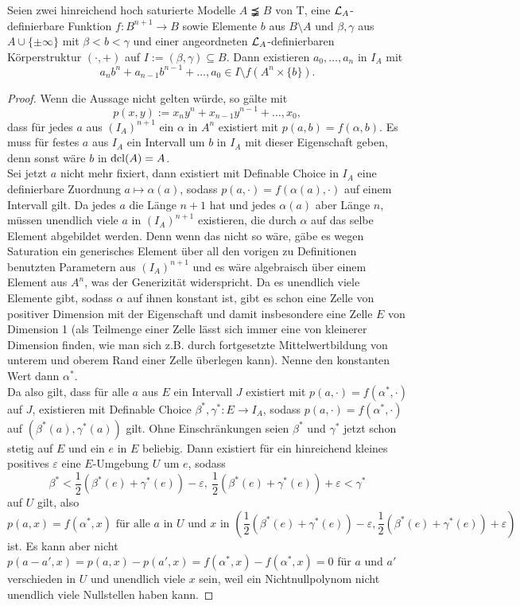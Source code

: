 \begin{lemma}\label{Hilfsaussage Kleinheit}
	Seien zwei hinreichend hoch saturierte Modelle $A\precneqq B$ von T, eine $\mathcal{L}_A$-definierbare Funktion $f:B^{n+1}\rightarrow B$ sowie Elemente $b$ aus $B\setminus A$ und $\beta,\gamma$ aus $A\cup\{\pm\infty\}$ mit $\beta<b<\gamma$ und einer angeordneten $\mathcal{L}_A$-definierbaren Körperstruktur $(\cdot,+)$ auf $I:=(\beta,\gamma)\subseteq B$. Dann existieren $a_0,\dots,a_n$ in $I_A$ mit $$a_nb^n+a_{n-1}b^{n-1}+\dots,a_0\in I\setminus f(A^n\times\{b\}).$$
\end{lemma}
\newpage
\begin{proof}
	Wenn die Aussage nicht gelten würde, so gälte mit $$p(x,y):=x_ny^n+x_{n-1}y^{n-1}+\dots,x_0,$$ dass für jedes $a$ aus $(I_A)^{n+1}$ ein $\alpha$ in $A^n$ existiert mit $p(a,b)=f(\alpha,b)$. Es muss für festes $a$ aus $I_A$ ein Intervall um $b$ in $I_A$ mit dieser Eigenschaft geben, denn sonst wäre $b$ in $\operatorname{dcl}(A)=A$.\\
	Sei jetzt $a$ nicht mehr fixiert, dann existiert mit Definable Choice in $I_A$ eine definierbare Zuordnung $a\mapsto\alpha(a)$, sodass $p(a,\cdot)=f(\alpha(a),\cdot)$ auf einem Intervall gilt. Da jedes $a$ die Länge $n+1$ hat und jedes $\alpha(a)$ aber Länge $n$, müssen unendlich viele $a$ in $(I_A)^{n+1}$ existieren, die durch $\alpha$ auf das selbe Element abgebildet werden. Denn wenn das nicht so wäre, gäbe es wegen Saturation ein generisches Element über all den vorigen zu Definitionen benutzten Parametern aus $(I_A)^{n+1}$ und es wäre algebraisch über einem Element aus $A^n$, was der Generizität widerspricht. Da es unendlich viele Elemente gibt, sodass $\alpha$ auf ihnen konstant ist, gibt es schon eine Zelle von positiver Dimension mit der Eigenschaft und damit insbesondere eine Zelle $E$ von Dimension 1 (als Teilmenge einer Zelle lässt sich immer eine von kleinerer Dimension finden, wie man sich z.B. durch fortgesetzte Mittelwertbildung von unterem und oberem Rand einer Zelle überlegen kann). Nenne den konstanten Wert dann $\alpha^*$.\\
	Da also gilt, dass für alle $a$ aus $E$ ein Intervall $J$ existiert mit $p(a,\cdot)=f(\alpha^*,\cdot)$ auf $J$, existieren mit Definable Choice $\beta^*,\gamma^*:E\rightarrow I_A$, sodass $p(a,\cdot)=f(\alpha^*,\cdot)$ auf $(\beta^*(a),\gamma^*(a))$ gilt. Ohne Einschränkungen seien $\beta^*$ und $\gamma^*$ jetzt schon stetig auf $E$ und ein $e$ in $E$ beliebig. Dann existiert für ein hinreichend kleines positives $\varepsilon$ eine $E$-Umgebung $U$ um $e$, sodass $$\beta^*<\frac{1}{2}(\beta^*(e)+\gamma^*(e))-\varepsilon,\ \frac{1}{2}(\beta^*(e)+\gamma^*(e))+\varepsilon<\gamma^*$$ auf $U$ gilt, also $$p(a,x)=f(\alpha^*,x)\text{ für alle }a\text{ in } U\text{ und }x\text{ in }(\frac{1}{2}(\beta^*(e)+\gamma^*(e))-\varepsilon,\frac{1}{2}(\beta^*(e)+\gamma^*(e))+\varepsilon)$$ ist. Es kann aber nicht $p(a-a',x)=p(a,x)-p(a',x)=f(\alpha^*,x)-f(\alpha^*,x)=0$ für $a$ und $a'$ verschieden in $U$ und unendlich viele $x$ sein, weil ein Nichtnullpolynom nicht unendlich viele Nullstellen haben kann.
\end{proof}

